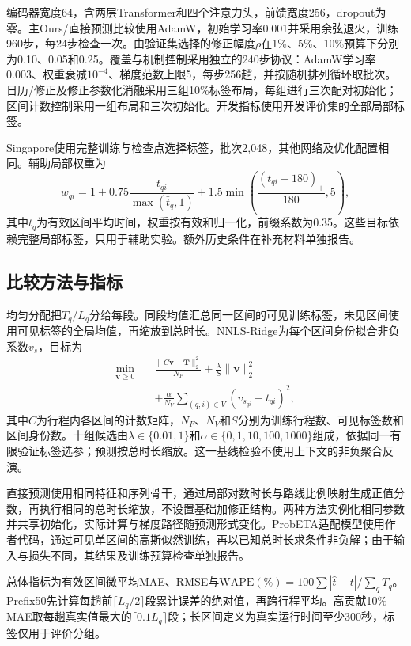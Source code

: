 编码器宽度64，含两层Transformer和四个注意力头，前馈宽度256，dropout为零。主Ours/直接预测比较使用AdamW，初始学习率0.001并采用余弦退火，训练960步，每24步检查一次。由验证集选择的修正幅度$\rho$在1\%、5\%、10\%预算下分别为0.10、0.05和0.25。覆盖与机制控制采用独立的240步协议：AdamW学习率0.003、权重衰减$10^{-4}$、梯度范数上限5，每步256趟，并按随机排列循环取批次。日历/修正及修正参数化消融采用三组10\%标签布局，每组进行三次配对初始化；区间计数控制采用一组布局和三次初始化。开发指标使用开发评价集的全部局部标签。

Singapore使用完整训练与检查点选择标签，批次2,048，其他网络及优化配置相同。辅助局部权重为
\begin{equation}
w_{qi}=1+0.75\frac{t_{qi}}{\max(\bar t_q,1)}
+1.5\min\left(\frac{(t_{qi}-180)_+}{180},5\right),
\end{equation}
其中$\bar t_q$为有效区间平均时间，权重按有效和归一化，前缀系数为0.35。这些目标依赖完整局部标签，只用于辅助实验。额外历史条件在补充材料单独报告。

\subsection{比较方法与指标}
均匀分配把$T_q/L_q$分给每段。同段均值汇总同一区间的可见训练标签，未见区间使用可见标签的全局均值，再缩放到总时长。NNLS-Ridge为每个区间身份拟合非负系数$v_s$，目标为
\begin{align}
\min_{\boldsymbol v\geq0}\quad&
\frac{\|C\boldsymbol v-\boldsymbol T\|_2^2}{N_F}
+\frac{\lambda}{S}\|\boldsymbol v\|_2^2\nonumber\\
&+\frac{\alpha}{N_V}\sum_{(q,i)\in V}(v_{s_{qi}}-t_{qi})^2,
\label{eq:inverse}
\end{align}
其中$C$为行程内各区间的计数矩阵，$N_F$、$N_V$和$S$分别为训练行程数、可见标签数和区间身份数。十组候选由$\lambda\in\{0.01,1\}$和$\alpha\in\{0,1,10,100,1000\}$组成，依据同一有限验证标签选参；预测按总时长缩放。这一基线检验不使用上下文的非负聚合反演。

直接预测使用相同特征和序列骨干，通过局部对数时长与路线比例映射生成正值分数，再执行相同的总时长缩放，不设置基础加修正结构。两种方法实例化相同参数并共享初始化，实际计算与梯度路径随预测形式变化。ProbETA适配模型使用作者代码\cite{xu2025probeta}，通过可见单区间的高斯似然训练，再以已知总时长求条件非负解；由于输入与损失不同，其结果及训练预算检查单独报告。

总体指标为有效区间微平均MAE、RMSE与$\mathrm{WAPE}(\%)=100\sum|\hat t-t|/\sum_qT_q$。Prefix50先计算每趟前$\lceil L_q/2\rceil$段累计误差的绝对值，再跨行程平均。高贡献10\% MAE取每趟真实值最大的$\lceil0.1L_q\rceil$段；长区间定义为真实运行时间至少300秒，标签仅用于评价分组。

